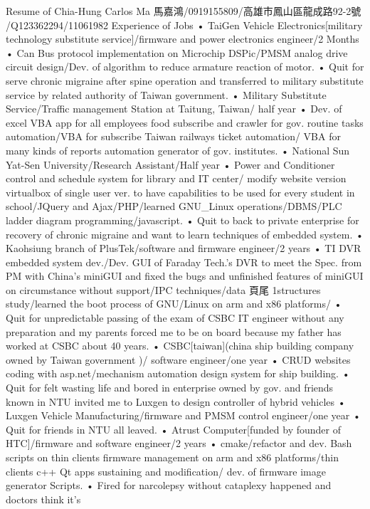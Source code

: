 Resume of Chia-Hung Carlos Ma
⾺嘉鴻/0919155809/⾼雄市鳳⼭區龍成路92-2號
/Q123362294/11061982
Experience of Jobs
• TaiGen Vehicle Electronics[military technology substitute service]/firmware
and power electronics engineer/2 Months
• Can Bus protocol implementation on Microchip DSPic/PMSM analog drive
circuit design/Dev. of algorithm to reduce armature reaction of motor.
• Quit for serve chronic migraine after spine operation and transferred to military
substitute service by related authority of Taiwan government.
• Military Substitute Service/Traffic management Station at Taitung, Taiwan/
half year
• Dev. of excel VBA app for all employees food subscribe and crawler for gov.
routine tasks automation/VBA for subscribe Taiwan railways ticket automation/
VBA for many kinds of reports automation generator of gov. institutes.
• National Sun Yat-Sen University/Research Assistant/Half year
• Power and Conditioner control and schedule system for library and IT center/
modify website version virtualbox of single user ver. to have capabilities to be
used for every student in school/JQuery and Ajax/PHP/learned GNU_Linux
operations/DBMS/PLC ladder diagram programming/javascript.
• Quit to back to private enterprise for recovery of chronic migraine and want to
learn techniques of embedded system.
• Kaohsiung branch of PlusTek/software and firmware engineer/2 years
• TI DVR embedded system dev./Dev. GUI of Faraday Tech.'s DVR to meet the
Spec. from PM with China's miniGUI and fixed the bugs and unfinished
features of miniGUI on circumstance without support/IPC techniques/data
⾴尾 1structures study/learned the boot process of GNU/Linux on arm and x86
platforms/
• Quit for unpredictable passing of the exam of CSBC IT engineer without any
preparation and my parents forced me to be on board because my father has
worked at CSBC about 40 years.
• CSBC[taiwan](china ship building company owned by Taiwan government )/
software engineer/one year
• CRUD websites coding with asp.net/mechanism automation design system for
ship building.
• Quit for felt wasting life and bored in enterprise owned by gov. and friends
known in NTU invited me to Luxgen to design controller of hybrid vehicles
• Luxgen Vehicle Manufacturing/firmware and PMSM control engineer/one
year
• Quit for friends in NTU all leaved.
• Atrust Computer[funded by founder of HTC]/firmware and software
engineer/2 years
• cmake/refactor and dev. Bash scripts on thin clients firmware management on
arm and x86 platforms/thin clients c++ Qt apps sustaining and modification/
dev. of firmware image generator Scripts.
• Fired for narcolepsy without cataplexy happened and doctors think it’s
